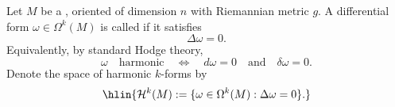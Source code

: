 \begin{definition} \label{definition:harmonic_forms_on_a_smooth_oriented_riemannian_manifold}
Let $M$ be a , oriented  of dimension $n$ with Riemannian metric $g$.
A differential form $\omega \in \Omega^k(M)$ is called  if it satisfies
$$
\Delta \omega = 0.
$$
Equivalently, by standard Hodge theory,
$$
\omega \quad \text{harmonic} \quad\iff\quad d\omega = 0 \quad\text{and}\quad \delta \omega = 0.
$$
Denote the space of harmonic $k$-forms by
$$\hlin{\mathcal{H}^k(M) := \{ \omega \in \Omega^k(M) : \Delta \omega = 0 \}.}$$
\end{definition}

